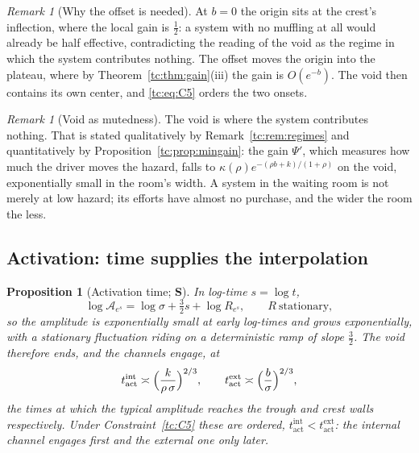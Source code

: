 \documentclass[11pt]{article}
\numberwithin{equation}{section}
\theoremstyle{plain}
\newtheorem{proposition}[theorem]{Proposition}
\theoremstyle{definition}
\theoremstyle{remark}
\newtheorem{remark}[theorem]{Remark}
\newcommand{\Ac}{\mathcal{A}}
\begin{document}
\begin{remark}[Why the offset is needed]\label{tc:rem:whyoffset}
At $b=0$ the origin sits at the crest's inflection, where the local gain
is $\tfrac12$: a system with no muffling at all would already be half
effective, contradicting the reading of the void as the regime in which
the system contributes nothing. The offset moves the origin into the
plateau, where by Theorem~\ref{tc:thm:gain}(iii) the gain is $O(e^{-b})$.
The void then contains its own center, and \eqref{tc:eq:C5} orders the
two onsets.
\end{remark}

\begin{remark}[Void as mutedness]\label{tc:rem:mutedness}
The void is where the system contributes nothing. That is stated
qualitatively by Remark~\ref{tc:rem:regimes} and quantitatively by
Proposition~\ref{tc:prop:mingain}: the gain $\Psi'$, which measures how
much the driver moves the hazard, falls to
$\kappa(\rho)e^{-(\rho b+k)/(1+\rho)}$ on the void, exponentially small
in the room's width. A system in the waiting room is not merely at low hazard;
its efforts have almost no purchase, and the wider the room the less.
\end{remark}

\subsection{Activation: time supplies the interpolation}
\label{tc:subsub:activation}

\begin{proposition}[Activation time; \textbf{S}]\label{tc:prop:tact}
In log-time $s=\log t$,
\begin{equation}\label{tc:eq:logamp}
\log\Ac_{e^{s}}=\log\sigma+\tfrac32s+\log R_{e^{s}},
\qquad R\ \text{stationary},
\end{equation}
so the amplitude is exponentially small at early log-times and grows
exponentially, with a stationary fluctuation riding on a deterministic
ramp of slope $\tfrac32$. The void therefore ends, and the channels
engage, at
\begin{equation}\label{tc:eq:tact}
t^{\mathrm{int}}_{\mathrm{act}}\asymp\Bigl(\frac{k}{\rho\,\sigma}
\Bigr)^{2/3},
\qquad
t^{\mathrm{ext}}_{\mathrm{act}}\asymp\Bigl(\frac{b}{\sigma}\Bigr)^{2/3},
\end{equation}
the times at which the typical amplitude reaches the trough and crest
walls respectively. Under Constraint~\ref{tc:C5} these are ordered,
$t^{\mathrm{int}}_{\mathrm{act}}<t^{\mathrm{ext}}_{\mathrm{act}}$: the
internal channel engages first and the external one only later.
\end{proposition}
\end{document}
